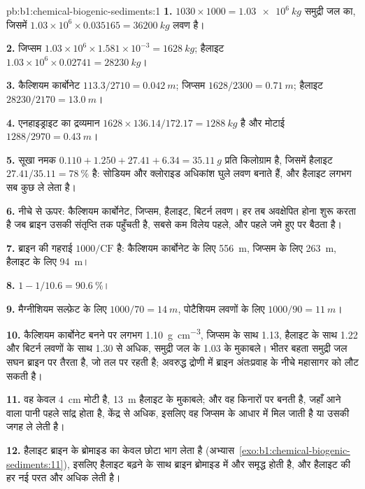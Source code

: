 \begin{solution}{pb:b1:chemical-biogenic-sediments:1}
\textbf{1.} $1030\times1000 = \qty{1.03e6}{kg}$ समुद्री जल का, जिसमें
$1.03\times10^6\times0.035165 = \qty{36200}{kg}$ लवण है।

\textbf{2.} जिप्सम $1.03\times10^6\times1.581\times10^{-3} = \qty{1628}{kg}$;
हैलाइट $1.03\times10^6\times0.02741 = \qty{28230}{kg}$।

\textbf{3.} कैल्शियम कार्बोनेट $113.3/2710 = \qty{0.042}{m}$; जिप्सम $1628/2300 =
\qty{0.71}{m}$; हैलाइट $28230/2170 = \qty{13.0}{m}$।

\textbf{4.} एनहाइड्राइट का द्रव्यमान $1628\times136.14/172.17 =
\qty{1288}{kg}$ है और मोटाई $1288/2970 = \qty{0.43}{m}$।

\textbf{5.} सूखा नमक $0.110 + 1.250 + 27.41 + 6.34 = \qty{35.11}{g}$ प्रति किलोग्राम है, जिसमें हैलाइट $27.41/35.11 = \qty{78}{\%}$ है: सोडियम और क्लोराइड अधिकांश घुले लवण बनाते हैं, और हैलाइट लगभग सब कुछ ले लेता है।

\textbf{6.} नीचे से ऊपर: कैल्शियम कार्बोनेट, जिप्सम, हैलाइट, बिटर्न लवण। हर  तब अवक्षेपित होना शुरू करता है जब ब्राइन उसकी संतृप्ति तक पहुँचती है, सबसे कम विलेय पहले, और पहले जमे हुए पर बैठता है।

\textbf{7.} ब्राइन की गहराई $1000/\mathrm{CF}$ है: कैल्शियम कार्बोनेट के लिए \qty{556}{m}, जिप्सम के लिए \qty{263}{m}, हैलाइट के लिए \qty{94}{m}।

\textbf{8.} $1 - 1/10.6 = \qty{90.6}{\%}$।

\textbf{9.} मैग्नीशियम सल्फ़ेट के लिए $1000/70 = \qty{14}{m}$, पोटैशियम लवणों के लिए $1000/90 = \qty{11}{m}$।

\textbf{10.} कैल्शियम कार्बोनेट बनने पर लगभग \qty{1.10}{g.cm^{-3}}, जिप्सम के साथ 1.13, हैलाइट के साथ 1.22 और बिटर्न लवणों के साथ 1.30 से अधिक, समुद्री जल के 1.03 के मुकाबले। भीतर बहता समुद्री जल सघन ब्राइन पर तैरता है, जो तल पर रहती है; अवरुद्ध द्रोणी में ब्राइन अंतःप्रवाह के नीचे महासागर को लौट सकती है।

\textbf{11.} वह केवल \qty{4}{cm} मोटी है, \qty{13}{m} हैलाइट के मुकाबले; और वह किनारों पर बनती है, जहाँ आने वाला पानी पहले सांद्र होता है, केंद्र से अधिक, इसलिए वह जिप्सम के आधार में मिल जाती है या उसकी जगह ले लेती है।

\textbf{12.} हैलाइट ब्राइन के ब्रोमाइड का केवल छोटा भाग लेता है (अभ्यास~\ref{exo:b1:chemical-biogenic-sediments:11}), इसलिए हैलाइट बढ़ने के साथ ब्राइन ब्रोमाइड में और समृद्ध होती है, और हैलाइट की हर नई परत और अधिक लेती है।


\end{solution}
